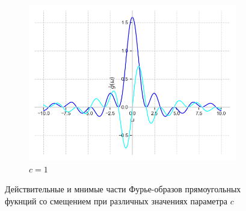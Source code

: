 \documentclass[a4paper, 16pt]{article}
\begin{document}
\begin{figure}[htbp]
        \hfill
        \begin{subfigure}{0.3\textwidth}
            \centering
            \includegraphics[width=\linewidth]{sh_1_re_im_rectf_int12.png}
            \caption{$c=1$}
            \label{fig:reimshrectf_3}
        \end{subfigure}
        \caption{Действительные и мнимые части Фурье-образов прямоугольных фукнций со смещением при различных значениях параметра $c$}
        \label{fig:reimshrectfs}
    \end{figure}
\end{document}
